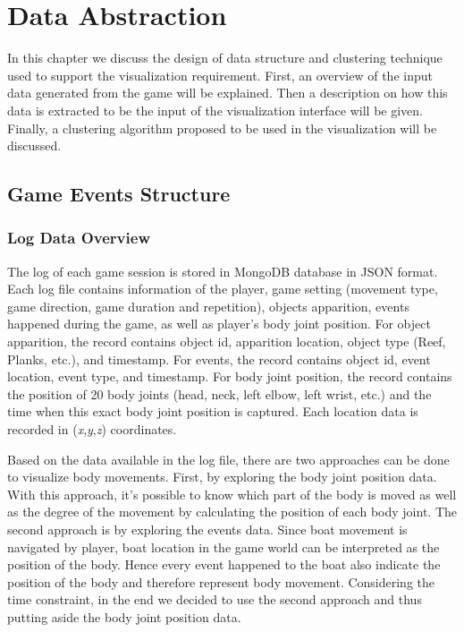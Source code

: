 \chapter{Data Abstraction}

In this chapter we discuss the design of data structure and clustering technique used to support the visualization requirement. First, an overview of the input data generated from the game will be explained. Then a description on how this data is extracted to be the input of the visualization interface will be given. Finally, a clustering algorithm proposed to be used in the visualization will be discussed.

\section{Game Events Structure}
\subsection{Log Data Overview}
The log of each game session is stored in MongoDB database in JSON format. Each log file contains information of the player, game setting (movement type, game direction, game duration and repetition), objects apparition, events happened during the game, as well as player's body joint position. For object apparition, the record contains object id, apparition location, object type (Reef, Planks, etc.), and timestamp. For events, the record contains object id, event location, event type, and timestamp. For body joint position, the record contains the position of 20 body joints (head, neck, left elbow, left wrist, etc.) and the time when this exact body joint position is captured. Each location data is recorded in (\textit{x},\textit{y},\textit{z}) coordinates.

Based on the data available in the log file, there are two approaches can be done to visualize body movements. First, by exploring the body joint position data. With this approach, it's possible to know which part of the body is moved as well as the degree of the movement by calculating the position of each body joint. The second approach is by exploring the events data. Since boat movement is navigated by player, boat location in the game world can be interpreted as the position of the body. Hence every event happened to the boat also indicate the position of the body and therefore represent body movement. Considering the time constraint, in the end we decided to use the second approach and thus putting aside the body joint position data. 

